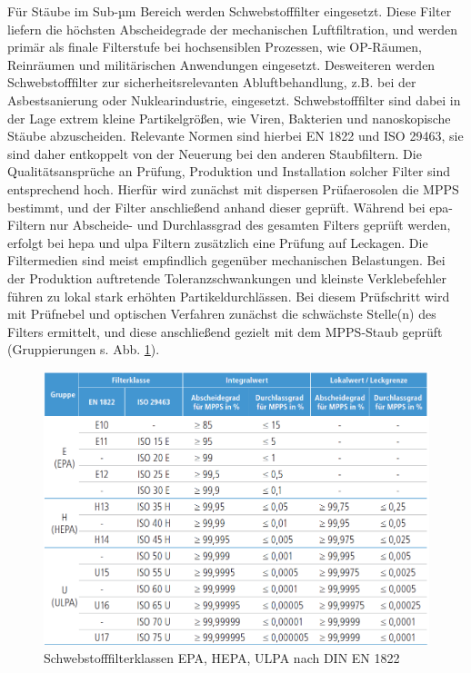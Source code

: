 Für Stäube im Sub-µm Bereich werden Schwebstofffilter eingesetzt. Diese Filter liefern die höchsten Abscheidegrade der mechanischen Luftfiltration, und werden primär als finale Filterstufe bei hochsensiblen Prozessen, wie OP-Räumen, Reinräumen und militärischen Anwendungen eingesetzt. Desweiteren werden Schwebstofffilter zur sicherheitsrelevanten Abluftbehandlung, z.B. bei der Asbestsanierung oder Nuklearindustrie, eingesetzt. \newline 
Schwebstofffilter sind dabei in der Lage extrem kleine Partikelgrößen, wie Viren, Bakterien und nanoskopische Stäube abzuscheiden. Relevante Normen sind hierbei EN 1822 \cite{1822} und ISO 29463, sie sind daher entkoppelt von der Neuerung bei den anderen Staubfiltern.
Die Qualitätsansprüche an Prüfung, Produktion und Installation solcher Filter sind entsprechend hoch. Hierfür wird zunächst mit dispersen Prüfaerosolen die \ac{MPPS} bestimmt, und der Filter anschließend anhand dieser geprüft. Während bei \ac{epa}-Filtern nur Abscheide- und Durchlassgrad des gesamten Filters geprüft werden, erfolgt bei \ac{hepa} und \ac{ulpa} Filtern zusätzlich eine Prüfung auf Leckagen. Die Filtermedien sind meist empfindlich gegenüber mechanischen Belastungen. \cite{Grundlagen_Filtertechnik} Bei der Produktion auftretende Toleranzschwankungen und kleinste Verklebefehler führen zu lokal stark erhöhten Partikeldurchlässen. Bei diesem Prüfschritt wird mit Prüfnebel und optischen Verfahren zunächst die schwächste Stelle(n) des Filters ermittelt, und diese anschließend gezielt mit dem \ac{MPPS}-Staub geprüft (Gruppierungen s. Abb. \ref{fi:filter_ehu}).
\begin{figure}[H]
    \begin{center}
        \includegraphics[width=\linewidth]{images/filter_EHU.png}
        \caption[Filterklassen Schwebstoffe]{Schwebstofffilterklassen EPA, HEPA, ULPA nach DIN EN 1822 \cite{1822}}
        \label{fi:filter_ehu}
    \end{center}
\end{figure}
